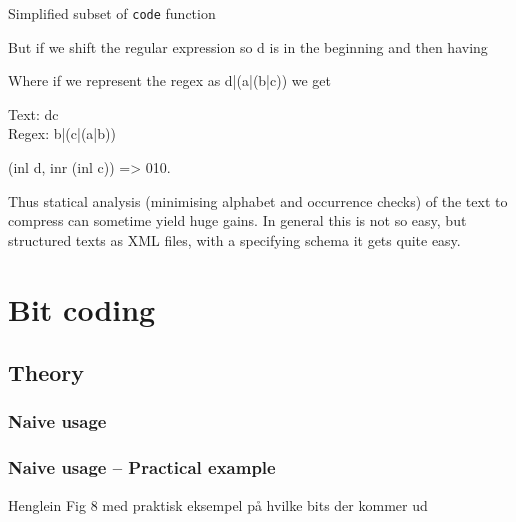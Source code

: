 \documentclass[slidestop,compress,mathserif, xcolor=table]{beamer}
\begin{document}
\begin{frame}

  \begin{block}{Simplified subset of \texttt{code} function}
\begin{semiverbatim}
\end{semiverbatim}
  \end{block}
  
  But if we shift the regular expression so d is in the beginning and then having 

  Where if we represent the regex as d|(a|(b|c)) we get

  \begin{example}
    Text: dc\\
    Regex: b|(c|(a|b))

  \end{example}

  (inl d, inr (inl c)) => 010.

  Thus statical analysis (minimising alphabet and occurrence checks) of the text
  to compress can sometime yield huge gains.
  In general this is not so easy, but structured texts as XML files, with a
  specifying schema it gets quite easy.

\end{frame}

\section{Bit coding}

\subsection{Theory}

\begin{frame}
  \frametitle{Naive usage}
  
\end{frame}

\begin{frame}
  \frametitle{Naive usage -- Practical example}
  Henglein Fig 8 med praktisk eksempel på hvilke bits der kommer ud
\end{frame}
\end{document}
